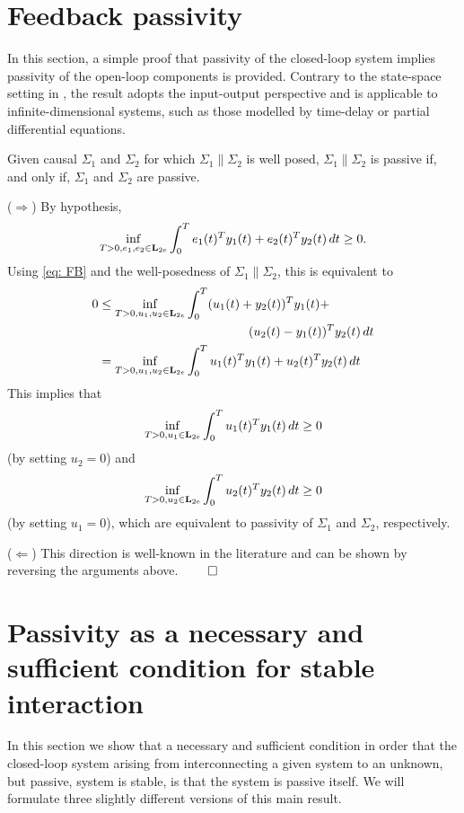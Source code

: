 \documentclass{ifacconf}
\newcommand{\Ltwoe}{\boldsymbol{\rm L}_{2e}}
\theoremstyle{definition}
\begin{document}
\section{Feedback passivity}

In this section, a simple proof that passivity of the closed-loop system implies passivity of the open-loop components is provided. Contrary to the
state-space setting in \cite{kerber-vds11}, the result adopts the input-output perspective and is applicable to infinite-dimensional systems, such as
those modelled by time-delay or partial differential equations.

\begin{thm}
  Given causal $\Sigma_1$ and $\Sigma_2$ for which $\Sigma_1 \| \Sigma_2$ is well posed, $\Sigma_1 \| \Sigma_2$ is passive if, and only if,
  $\Sigma_1$ and $\Sigma_2$ are passive.
\end{thm}

\begin{pf}
 ($\Longrightarrow$) By hypothesis, 
\[
\inf_{T > 0, e_1, e_2 \in \Ltwoe} \int_0^T e_1(t)^T y_1(t) + e_2(t)^Ty_2(t) \, dt \geq 0.
\]
Using \eqref{eq: FB} and the well-posedness of $\Sigma_1 \| \Sigma_2$, this is equivalent to
\begin{align*}
  0 & \leq \inf_{T > 0, u_1, u_2 \in \Ltwoe} \int_0^T (u_1(t) + y_2(t))^T y_1(t) + \\
 & \qquad\qquad\qquad\qquad\qquad\qquad (u_2(t) - y_1(t))^Ty_2(t) \, dt \\
    & = \inf_{T > 0, u_1, u_2 \in \Ltwoe} \int_0^T u_1(t)^T y_1(t) + u_2(t)^Ty_2(t) \, dt
\end{align*}
This implies that 
\[
\inf_{T > 0, u_1\in \Ltwoe} \int_0^T u_1(t)^T y_1(t) \, dt \geq 0
\]
(by setting $u_2 = 0$) and 
\[
\inf_{T > 0, u_2\in \Ltwoe} \int_0^T u_2(t)^T y_2(t) \, dt \geq 0
\]
(by setting $u_1 = 0$), which are equivalent to passivity of $\Sigma_1$ and $\Sigma_2$, respectively.

($\Longleftarrow$) This direction is well-known in the literature and can be shown by reversing the arguments above. \hfill$\qed$
\end{pf}

\section{Passivity as a necessary and sufficient condition for stable interaction}

In this section we show that a necessary and sufficient condition in order that the closed-loop system arising from interconnecting a given system to an unknown, but passive, system is stable, is that the system is passive itself. We will formulate three slightly different versions of this main result.
\end{document}
